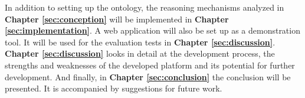 In addition to setting up the ontology, the reasoning mechanisms analyzed in \textbf{Chapter \ref{sec:conception}} will be implemented in \textbf{Chapter \ref{sec:implementation}}. A web application will also be set up as a demonstration tool. It will be used for the evaluation tests in \textbf{Chapter \ref{sec:discussion}}.\\

\textbf{Chapter \ref{sec:discussion}} looks in detail at the development process, the strengths and weaknesses of the developed platform and its potential for further development. And finally, in \textbf{Chapter \ref{sec:conclusion}} the conclusion will be presented. It is accompanied by suggestions for future work.


